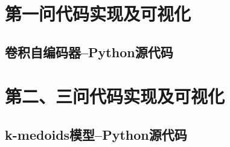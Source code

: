 \documentclass{whutmod}
\begin{document}
    \newpage
    \appendix
    \section{第一问代码实现及可视化}
        \subsection*{卷积自编码器--Python源代码}
            
    \section{第二、三问代码实现及可视化}
        \subsection*{k-medoids模型--Python源代码}
            
\end{document}

